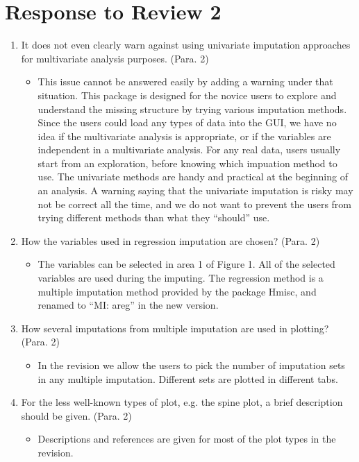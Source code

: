 \documentclass[12pt,english]{article}
\begin{document}
\section*{Response to Review 2}
\begin{enumerate}

\item It does not even clearly warn against using univariate imputation
approaches for multivariate analysis purposes. (Para. 2)
\begin{itemize}
\item This issue cannot be answered easily by adding a warning under that
situation. This package is designed for the novice users to explore
and understand the missing structure by trying various imputation
methods. Since the users could load any types of data into the GUI,
we have no idea if the multivariate analysis is appropriate, or if
the variables are independent in a multivariate analysis. For any
real data, users usually start from an exploration, before knowing
which impuation method to use. The univariate methods are handy and
practical at the beginning of an analysis. A warning saying that the
univariate imputation is risky may not be correct all the time, and
we do not want to prevent the users from trying different methods
than what they ``should'' use.
\end{itemize}

\item How the variables used in regression imputation are chosen? (Para.
2)
\begin{itemize}
\item The variables can be selected in area 1 of Figure 1. All of the selected
variables are used during the imputing. The regression method is a
multiple imputation method provided by the package Hmisc, and renamed
to ``MI: areg'' in the new version.
\end{itemize}

\item How several imputations from multiple imputation are used in plotting?
(Para. 2)
\begin{itemize}
\item In the revision we allow the users to pick the number of imputation
sets in any multiple imputation. Different sets are plotted in different
tabs.
\end{itemize}

\item For the less well-known types of plot, e.g. the spine plot, a brief
description should be given. (Para. 2)
\begin{itemize}
\item Descriptions and references are given for most of the plot types in
the revision.
\end{itemize}


\end{enumerate}
\end{document}
